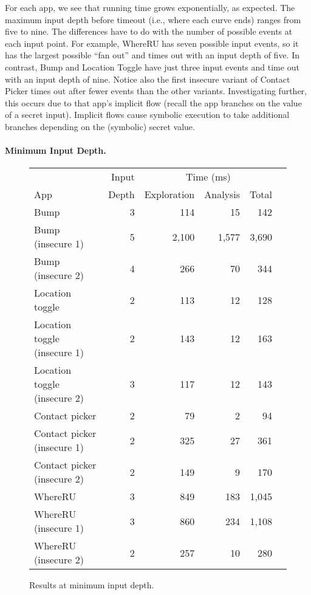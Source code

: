 \documentclass{llncs}
\begin{document}
For each app, we see that running time
grows exponentially, as expected. The maximum input depth
before timeout (i.e., where each curve ends) ranges from five to
nine. The differences have to do with the number of possible events at
each input point. For example, WhereRU has seven possible input events, so
it has the largest possible ``fan out'' and times out with an input
depth of five. In contrast, Bump and Location Toggle have just three
input events and time out with an input depth of nine. Notice also the first
insecure variant of Contact Picker times out after fewer events than
the other variants. Investigating further, this occurs due to
that app's implicit flow (recall the app branches on the value of a
secret input). Implicit flows cause symbolic execution to take
additional branches depending on the (symbolic) secret value.

\paragraph*{Minimum Input Depth.}

\begin{figure*}[t]
\centering
\begin{tabular}{ | l | r | r | r | r | r | }
  \hline
  &Input&\multicolumn{3}{c|}{Time (ms)} \\ \cline{3-5}
App & Depth & Exploration & Analysis & Total \\ \hline
  \hline
  Bump & 3 & 114 &  15 & 142 \\
  Bump (insecure 1) & 5 & 2,100 & 1,577 & 3,690 \\
  Bump (insecure 2) & 4 & 266 & 70 & 344 \\\hline
  Location toggle & 2 &  113 & 12 & 128 \\
  Location toggle (insecure 1) & 2 &  143 & 12 & 163 \\
  Location toggle (insecure 2) & 3 & 117 & 12 & 143 \\\hline
  Contact picker & 2 &  79 & 2 & 94 \\
  Contact picker (insecure 1) & 2 &  325 & 27 & 361 \\
  Contact picker (insecure 2) & 2 &  149 & 9 & 170 \\\hline
  WhereRU & 3 & 849 & 183 & 1,045 \\
  WhereRU (insecure 1) & 3 & 860 & 234 & 1,108 \\
  WhereRU (insecure 2) & 2 & 257 & 10 & 280 \\
  \hline
\end{tabular}
\caption{Results at minimum input depth.}
\label{fig:results}
\end{figure*}
\end{document}
